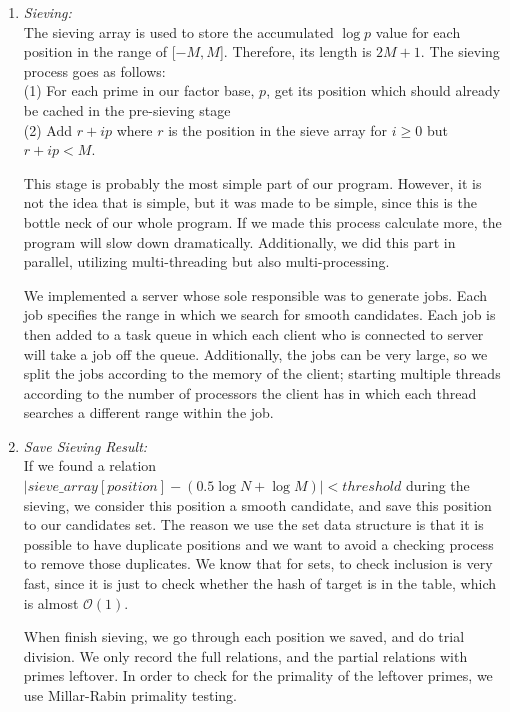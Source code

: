 \documentclass[12pt]{article} %
\newcommand{\itemgap}[1][2]{\vspace{#1mm}}
\begin{document}
\begin{enumerate}
		\item \textit{Sieving:} \itemgap
		\\ The sieving array is used to store the accumulated $\log{p}$ value for each position in the range of [$-M, M$]. Therefore, its length is $2M+1$. The sieving process goes as follows:\\(1) For each prime in our factor base, $p$, get its position which should already be cached in the pre-sieving stage\\(2) Add $r+ip$ where $r$ is the position in the sieve array for $i\ge0$ but $r+ip<M$.
		
		This stage is probably the most simple part of our program. However, it is not the idea that is simple, but it was made to be simple, since this is the bottle neck of our whole program. If we made this process calculate more, the program will slow down dramatically. Additionally, we did this part in parallel, utilizing multi-threading but also multi-processing. 
		
		We implemented a server whose sole responsible was to generate jobs. Each job specifies the range in which we search for smooth candidates. Each job is then added to a task queue in which each client who is connected to server will take a job off the queue. Additionally, the jobs can be very large, so we split the jobs according to the memory of the client; starting multiple threads according to the number of processors the client has in which each thread searches a different range within the job.
		
		\item \textit{Save Sieving Result:} \itemgap
		\\ If we found a relation $\left|sieve\_array[position]-(0.5\log{N}+\log{M})\right| < threshold$ during the sieving, we consider this position a smooth candidate, and save this position to our candidates set. The reason we use the set data structure is that it is possible to have duplicate positions and we want to avoid a checking process to remove those duplicates. We know that for sets, to check inclusion is very fast, since it is just to check whether the hash of target is in the table, which is almost $\mathcal{O}(1)$. 
		
		When finish sieving, we go through each position we saved, and do trial division. We only record the full relations, and the partial relations with primes leftover. In order to check for the primality of the leftover primes, we use Millar-Rabin primality testing. 
		

\end{enumerate}
\end{document}
